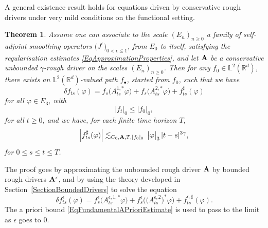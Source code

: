 \documentclass[11pt,a4paper]{amsart}
\newcommand{\RR}{\mathbb{R}}  \newcommand{\CC}{\mathbb{C}}  \newcommand{\LL}{\mathbb{L}}  \newcommand{\WW}{\mathbb{W}}
\renewcommand{\leq}{\leqslant}
\renewcommand{\geq}{\geqslant}
\newcommand{\ssk}{\smallskip}
\newtheorem{thm}{\hspace{-0.15cm}  {\sc Theorem} } %
\numberwithin{equation}{section} %
\begin{document}
\ssk

A general existence result holds for equations driven by conservative rough drivers under very mild conditions on the functional setting.

\begin{thm}
\label{ThmRDEHilbertGeneral}
Assume one can associate to the scale $(E_n)_{n\geq 0}$ a family of \emph{self-adjoint} smoothing operators $\big(J^\epsilon\big)_{0<\epsilon\leq 1}$, from $E_0$ to itself, satisfying the regularisation estimates \eqref{EqApproximationProperties}, and let $\bf A$ be a conservative unbounded $\gamma$-rough driver on the scales $(E_n)_{n\geq 0}$. Then for any $f_0\in\LL^2(\RR^d)$, there exists an $\LL^2(\RR^d)$-valued path $f_\bullet$, started from $f_0$, such that we have
\begin{equation*}
\delta f_{ts}(\varphi) = f_s\Big(A^{1,*}_{ts}\varphi\Big) + f_s\Big(A^{2,*}_{ts}\varphi\Big) + f^\sharp_{ts}(\varphi)
\end{equation*}
for all $\varphi\in E_3$, with 
\begin{equation*}
\big| f_t\big|_0\leq \big| f_0\big|_0,
\end{equation*}
for all $ t\geq 0$, and we have, for each finite time horizon $T$,
\begin{equation}
\label{EqBoundRemainderX}
\Big| f^\sharp_{ts}(\varphi) \Big| \lesssim_{C_0,{\bf A}, T,| f_0|_0}\,\big|\varphi\big|_3\,|t-s|^{3\gamma},
\end{equation}
for $0\leq s\leq t\leq T$.
\end{thm}

\noindent The proof goes by approximating the unbounded rough driver $\bf A$ by bounded rough drivers  ${\bf A}^\epsilon$, and by using the theory developed in Section~\ref{SectionBoundedDrivers} to solve the equation
\begin{equation}
\label{EqApproximatedRDE}
\delta f^\epsilon_{ts}(\varphi) = f^\epsilon_s\Big(A^{\epsilon,1,*}_{ts}\varphi\Big) + f^\epsilon_s\Big(\big(A^{\epsilon,2}_{ts}\big)^*\varphi\Big) + f^{\epsilon,\sharp}_{ts}(\varphi).
\end{equation}
The a priori bound \eqref{EqFundamentalAPrioriEstimate} is used to pass to the limit as  $\epsilon$ goes to $0$.

\medskip
\end{document}
